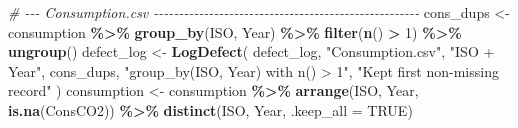 \documentclass[
]{article}
\newenvironment{Shaded}{\begin{snugshade}}{\end{snugshade}}
\newcommand{\AttributeTok}[1]{\textcolor[rgb]{0.13,0.29,0.53}{#1}}
\newcommand{\CommentTok}[1]{\textcolor[rgb]{0.56,0.35,0.01}{\textit{#1}}}
\newcommand{\ConstantTok}[1]{\textcolor[rgb]{0.56,0.35,0.01}{#1}}
\newcommand{\DecValTok}[1]{\textcolor[rgb]{0.00,0.00,0.81}{#1}}
\newcommand{\FunctionTok}[1]{\textcolor[rgb]{0.13,0.29,0.53}{\textbf{#1}}}
\newcommand{\NormalTok}[1]{#1}
\newcommand{\OtherTok}[1]{\textcolor[rgb]{0.56,0.35,0.01}{#1}}
\newcommand{\SpecialCharTok}[1]{\textcolor[rgb]{0.81,0.36,0.00}{\textbf{#1}}}
\newcommand{\StringTok}[1]{\textcolor[rgb]{0.31,0.60,0.02}{#1}}
\begin{document}
\begin{Shaded}
\begin{Highlighting}[]
\CommentTok{\# {-}{-}{-} Consumption.csv {-}{-}{-}{-}{-}{-}{-}{-}{-}{-}{-}{-}{-}{-}{-}{-}{-}{-}{-}{-}{-}{-}{-}{-}{-}{-}{-}{-}{-}{-}{-}{-}{-}{-}{-}{-}{-}{-}{-}{-}{-}{-}{-}{-}{-}{-}{-}{-}{-}{-}{-}{-}{-}}
\NormalTok{cons\_dups }\OtherTok{\textless{}{-}}\NormalTok{ consumption }\SpecialCharTok{\%\textgreater{}\%} \FunctionTok{group\_by}\NormalTok{(ISO, Year) }\SpecialCharTok{\%\textgreater{}\%} \FunctionTok{filter}\NormalTok{(}\FunctionTok{n}\NormalTok{() }\SpecialCharTok{\textgreater{}} \DecValTok{1}\NormalTok{) }\SpecialCharTok{\%\textgreater{}\%}
  \FunctionTok{ungroup}\NormalTok{()}
\NormalTok{defect\_log }\OtherTok{\textless{}{-}} \FunctionTok{LogDefect}\NormalTok{(}
\NormalTok{  defect\_log, }\StringTok{"Consumption.csv"}\NormalTok{, }\StringTok{"ISO + Year"}\NormalTok{, cons\_dups,}
  \StringTok{"group\_by(ISO, Year) with n() \textgreater{} 1"}\NormalTok{, }\StringTok{"Kept first non{-}missing record"}
\NormalTok{)}
\NormalTok{consumption }\OtherTok{\textless{}{-}}\NormalTok{ consumption }\SpecialCharTok{\%\textgreater{}\%}
  \FunctionTok{arrange}\NormalTok{(ISO, Year, }\FunctionTok{is.na}\NormalTok{(ConsCO2)) }\SpecialCharTok{\%\textgreater{}\%}
  \FunctionTok{distinct}\NormalTok{(ISO, Year, }\AttributeTok{.keep\_all =} \ConstantTok{TRUE}\NormalTok{)}


\end{Highlighting}
\end{Shaded}
\end{document}
